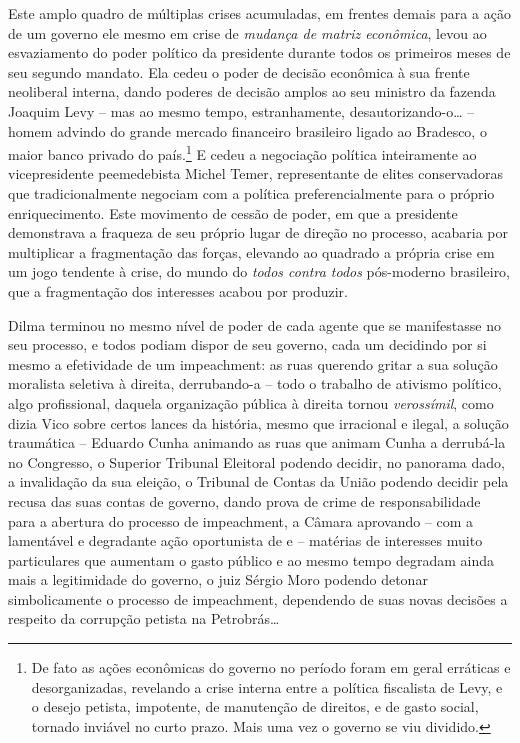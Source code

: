 Este amplo quadro de múltiplas crises acumuladas, em frentes demais para
a ação de um governo ele mesmo em crise de \emph{mudança de matriz
econômica}, levou ao esvaziamento do poder político da presidente
durante todos os primeiros meses de seu segundo mandato. Ela cedeu o
poder de decisão econômica à sua frente neoliberal interna, dando
poderes de decisão amplos ao seu ministro da fazenda Joaquim Levy -- mas
ao mesmo tempo, estranhamente, desautorizando-o… -- homem advindo do
grande mercado financeiro brasileiro ligado ao Bradesco, o maior banco
privado do país.\footnote{De fato as ações econômicas do governo no
  período foram em geral erráticas e desorganizadas, revelando a crise
  interna entre a política fiscalista de Levy, e o desejo petista,
  impotente, de manutenção de direitos, e de gasto social, tornado
  inviável no curto prazo. Mais uma vez o governo se viu dividido.} E
cedeu a negociação política inteiramente ao vicepresidente peemedebista
Michel Temer, representante de elites conservadoras que tradicionalmente
negociam com a política preferencialmente para o próprio enriquecimento.
Este movimento de cessão de poder, em que a presidente demonstrava a
fraqueza de seu próprio lugar de direção no processo, acabaria por
multiplicar a fragmentação das forças, elevando ao quadrado a própria
crise em um jogo tendente à crise, do mundo do \emph{todos contra todos}
pós-moderno brasileiro, que a fragmentação dos interesses acabou por
produzir.

Dilma terminou no mesmo nível de poder de cada agente que se
manifestasse no seu processo, e todos podiam dispor de seu governo, cada
um decidindo por si mesmo a efetividade de um impeachment: as ruas
querendo gritar a sua solução moralista seletiva à direita, derrubando-a
-- todo o trabalho de ativismo político, algo profissional, daquela
organização pública à direita tornou \emph{verossímil}, como dizia Vico
sobre certos lances da história, mesmo que irracional e ilegal, a
solução traumática -- Eduardo Cunha animando as ruas que animam Cunha a
derrubá-la no Congresso, o Superior Tribunal Eleitoral podendo decidir,
no panorama dado, a invalidação da sua eleição, o Tribunal de Contas da
União podendo decidir pela recusa das suas contas de governo, dando
prova de crime de responsabilidade para a abertura do processo de
impeachment, a Câmara aprovando -- com a lamentável e degradante ação
oportunista de  e  -- matérias de interesses muito particulares
que aumentam o gasto público e ao mesmo tempo degradam ainda mais a
legitimidade do governo, o juiz Sérgio Moro podendo detonar
simbolicamente o processo de impeachment, dependendo de suas novas
decisões a respeito da corrupção petista na Petrobrás…

